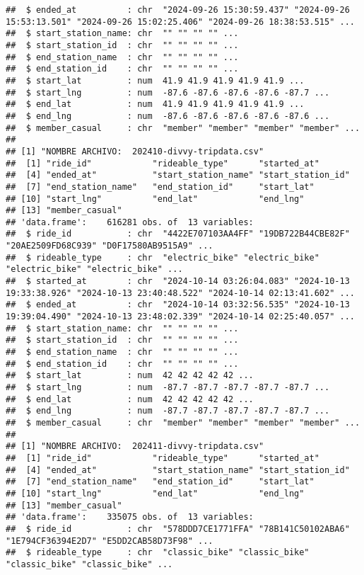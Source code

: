 \documentclass[
]{article}
\begin{document}
\begin{verbatim}
##  $ ended_at          : chr  "2024-09-26 15:30:59.437" "2024-09-26 15:53:13.501" "2024-09-26 15:02:25.406" "2024-09-26 18:38:53.515" ...
##  $ start_station_name: chr  "" "" "" "" ...
##  $ start_station_id  : chr  "" "" "" "" ...
##  $ end_station_name  : chr  "" "" "" "" ...
##  $ end_station_id    : chr  "" "" "" "" ...
##  $ start_lat         : num  41.9 41.9 41.9 41.9 41.9 ...
##  $ start_lng         : num  -87.6 -87.6 -87.6 -87.6 -87.7 ...
##  $ end_lat           : num  41.9 41.9 41.9 41.9 41.9 ...
##  $ end_lng           : num  -87.6 -87.6 -87.6 -87.6 -87.6 ...
##  $ member_casual     : chr  "member" "member" "member" "member" ...
## 
## [1] "NOMBRE ARCHIVO:  202410-divvy-tripdata.csv"
##  [1] "ride_id"            "rideable_type"      "started_at"        
##  [4] "ended_at"           "start_station_name" "start_station_id"  
##  [7] "end_station_name"   "end_station_id"     "start_lat"         
## [10] "start_lng"          "end_lat"            "end_lng"           
## [13] "member_casual"     
## 'data.frame':    616281 obs. of  13 variables:
##  $ ride_id           : chr  "4422E707103AA4FF" "19DB722B44CBE82F" "20AE2509FD68C939" "D0F17580AB9515A9" ...
##  $ rideable_type     : chr  "electric_bike" "electric_bike" "electric_bike" "electric_bike" ...
##  $ started_at        : chr  "2024-10-14 03:26:04.083" "2024-10-13 19:33:38.926" "2024-10-13 23:40:48.522" "2024-10-14 02:13:41.602" ...
##  $ ended_at          : chr  "2024-10-14 03:32:56.535" "2024-10-13 19:39:04.490" "2024-10-13 23:48:02.339" "2024-10-14 02:25:40.057" ...
##  $ start_station_name: chr  "" "" "" "" ...
##  $ start_station_id  : chr  "" "" "" "" ...
##  $ end_station_name  : chr  "" "" "" "" ...
##  $ end_station_id    : chr  "" "" "" "" ...
##  $ start_lat         : num  42 42 42 42 42 ...
##  $ start_lng         : num  -87.7 -87.7 -87.7 -87.7 -87.7 ...
##  $ end_lat           : num  42 42 42 42 42 ...
##  $ end_lng           : num  -87.7 -87.7 -87.7 -87.7 -87.7 ...
##  $ member_casual     : chr  "member" "member" "member" "member" ...
## 
## [1] "NOMBRE ARCHIVO:  202411-divvy-tripdata.csv"
##  [1] "ride_id"            "rideable_type"      "started_at"        
##  [4] "ended_at"           "start_station_name" "start_station_id"  
##  [7] "end_station_name"   "end_station_id"     "start_lat"         
## [10] "start_lng"          "end_lat"            "end_lng"           
## [13] "member_casual"     
## 'data.frame':    335075 obs. of  13 variables:
##  $ ride_id           : chr  "578DDD7CE1771FFA" "78B141C50102ABA6" "1E794CF36394E2D7" "E5DD2CAB58D73F98" ...
##  $ rideable_type     : chr  "classic_bike" "classic_bike" "classic_bike" "classic_bike" ...

\end{verbatim}
\end{document}

